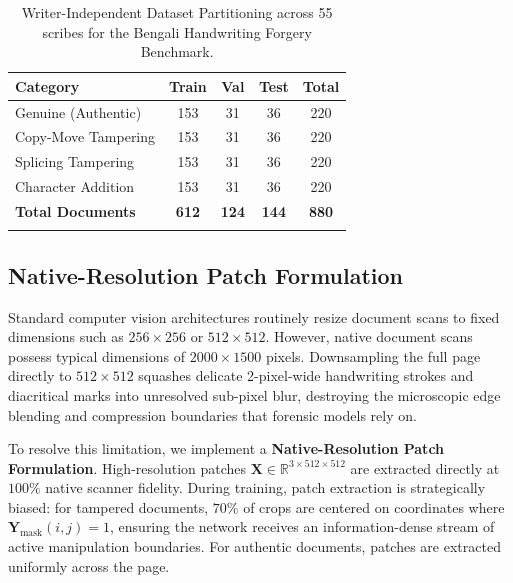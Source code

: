 \documentclass[pdflatex,sn-mathphys-num,iicol]{sn-jnl}
\begin{document}
\begin{table}[ht]
\caption{Writer-Independent Dataset Partitioning across 55 scribes for the Bengali Handwriting Forgery Benchmark.}\label{tab:dataset_split}
\setlength{\tabcolsep}{2.5pt}
\begin{tabular*}{\columnwidth}{@{\extracolsep\fill}lcccc@{}}
\toprule
\textbf{Category} & \textbf{Train} & \textbf{Val} & \textbf{Test} & \textbf{Total} \\
\midrule
Genuine (Authentic)    & 153 & 31 & 36 & 220 \\
Copy-Move Tampering    & 153 & 31 & 36 & 220 \\
Splicing Tampering     & 153 & 31 & 36 & 220 \\
Character Addition     & 153 & 31 & 36 & 220 \\
\midrule
\textbf{Total Documents} & \textbf{612} & \textbf{124} & \textbf{144} & \textbf{880} \\
\botrule
\end{tabular*}
\end{table}

\subsection{Native-Resolution Patch Formulation}\label{subsec3_5}
Standard computer vision architectures routinely resize document scans to fixed dimensions such as $256 \times 256$ or $512 \times 512$. However, native document scans possess typical dimensions of $2000 \times 1500$ pixels. Downsampling the full page directly to $512 \times 512$ squashes delicate 2-pixel-wide handwriting strokes and diacritical marks into unresolved sub-pixel blur, destroying the microscopic edge blending and compression boundaries that forensic models rely on.

To resolve this limitation, we implement a \textbf{Native-Resolution Patch Formulation}. High-resolution patches $\mathbf{X} \in \mathbb{R}^{3 \times 512 \times 512}$ are extracted directly at $100\%$ native scanner fidelity. During training, patch extraction is strategically biased: for tampered documents, $70\%$ of crops are centered on coordinates where $\mathbf{Y}_{\text{mask}}(i, j) = 1$, ensuring the network receives an information-dense stream of active manipulation boundaries. For authentic documents, patches are extracted uniformly across the page.
\end{document}
